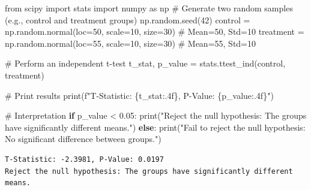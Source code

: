 \documentclass[
  letterpaper,
  DIV=11,
  numbers=noendperiod]{scrreprt}
\newenvironment{Shaded}{\begin{snugshade}}{\end{snugshade}}
\newcommand{\BuiltInTok}[1]{\textcolor[rgb]{0.00,0.23,0.31}{#1}}
\newcommand{\CommentTok}[1]{\textcolor[rgb]{0.37,0.37,0.37}{#1}}
\newcommand{\ControlFlowTok}[1]{\textcolor[rgb]{0.00,0.23,0.31}{\textbf{#1}}}
\newcommand{\DecValTok}[1]{\textcolor[rgb]{0.68,0.00,0.00}{#1}}
\newcommand{\FloatTok}[1]{\textcolor[rgb]{0.68,0.00,0.00}{#1}}
\newcommand{\ImportTok}[1]{\textcolor[rgb]{0.00,0.46,0.62}{#1}}
\newcommand{\NormalTok}[1]{\textcolor[rgb]{0.00,0.23,0.31}{#1}}
\newcommand{\OperatorTok}[1]{\textcolor[rgb]{0.37,0.37,0.37}{#1}}
\newcommand{\SpecialCharTok}[1]{\textcolor[rgb]{0.37,0.37,0.37}{#1}}
\newcommand{\SpecialStringTok}[1]{\textcolor[rgb]{0.13,0.47,0.30}{#1}}
\newcommand{\StringTok}[1]{\textcolor[rgb]{0.13,0.47,0.30}{#1}}
\begin{document}
\begin{Shaded}
\begin{Highlighting}[]
\ImportTok{from}\NormalTok{ scipy }\ImportTok{import}\NormalTok{ stats}
\ImportTok{import}\NormalTok{ numpy }\ImportTok{as}\NormalTok{ np}
\CommentTok{\# Generate two random samples (e.g., control and treatment groups)}
\NormalTok{np.random.seed(}\DecValTok{42}\NormalTok{)}
\NormalTok{control }\OperatorTok{=}\NormalTok{ np.random.normal(loc}\OperatorTok{=}\DecValTok{50}\NormalTok{, scale}\OperatorTok{=}\DecValTok{10}\NormalTok{, size}\OperatorTok{=}\DecValTok{30}\NormalTok{)  }\CommentTok{\# Mean=50, Std=10}
\NormalTok{treatment }\OperatorTok{=}\NormalTok{ np.random.normal(loc}\OperatorTok{=}\DecValTok{55}\NormalTok{, scale}\OperatorTok{=}\DecValTok{10}\NormalTok{, size}\OperatorTok{=}\DecValTok{30}\NormalTok{)  }\CommentTok{\# Mean=55, Std=10}

\CommentTok{\# Perform an independent t{-}test}
\NormalTok{t\_stat, p\_value }\OperatorTok{=}\NormalTok{ stats.ttest\_ind(control, treatment)}

\CommentTok{\# Print results}
\BuiltInTok{print}\NormalTok{(}\SpecialStringTok{f"T{-}Statistic: }\SpecialCharTok{\{}\NormalTok{t\_stat}\SpecialCharTok{:.4f\}}\SpecialStringTok{, P{-}Value: }\SpecialCharTok{\{}\NormalTok{p\_value}\SpecialCharTok{:.4f\}}\SpecialStringTok{"}\NormalTok{)}

\CommentTok{\# Interpretation}
\ControlFlowTok{if}\NormalTok{ p\_value }\OperatorTok{\textless{}} \FloatTok{0.05}\NormalTok{:}
    \BuiltInTok{print}\NormalTok{(}\StringTok{"Reject the null hypothesis: The groups have significantly different means."}\NormalTok{)}
\ControlFlowTok{else}\NormalTok{:}
    \BuiltInTok{print}\NormalTok{(}\StringTok{"Fail to reject the null hypothesis: No significant difference between groups."}\NormalTok{)}
\end{Highlighting}
\end{Shaded}

\begin{verbatim}
T-Statistic: -2.3981, P-Value: 0.0197
Reject the null hypothesis: The groups have significantly different means.
\end{verbatim}
\end{document}
